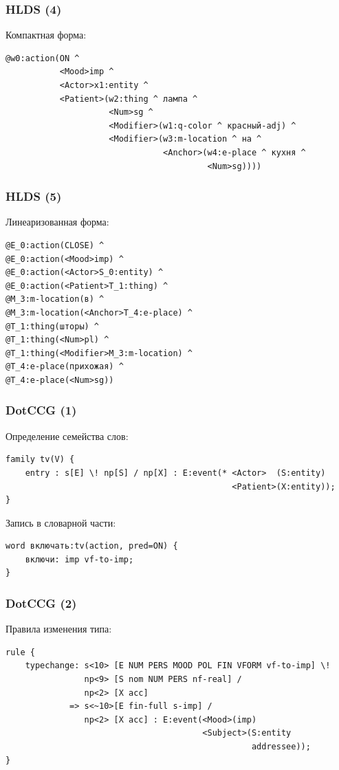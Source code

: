 \documentclass{beamer}
\begin{document}
\begin{frame}[fragile]
\frametitle{HLDS (4)}
Компактная форма:
{\footnotesize \begin{verbatim}
@w0:action(ON ^
           <Mood>imp ^
           <Actor>x1:entity ^
           <Patient>(w2:thing ^ лампа ^
                     <Num>sg ^
                     <Modifier>(w1:q-color ^ красный-adj) ^
                     <Modifier>(w3:m-location ^ на ^
                                <Anchor>(w4:e-place ^ кухня ^
                                         <Num>sg))))
\end{verbatim}}
\end{frame}

\begin{frame}[fragile]
\frametitle{HLDS (5)}
Линеаризованная форма:
{\footnotesize \begin{verbatim}
@E_0:action(CLOSE) ^ 
@E_0:action(<Mood>imp) ^
@E_0:action(<Actor>S_0:entity) ^ 
@E_0:action(<Patient>T_1:thing) ^ 
@M_3:m-location(в) ^ 
@M_3:m-location(<Anchor>T_4:e-place) ^ 
@T_1:thing(шторы) ^ 
@T_1:thing(<Num>pl) ^ 
@T_1:thing(<Modifier>M_3:m-location) ^ 
@T_4:e-place(прихожая) ^ 
@T_4:e-place(<Num>sg))
\end{verbatim}}
\end{frame}

\begin{frame}[fragile]
\frametitle{DotCCG (1)}
Определение семейства слов:
{\footnotesize \begin{verbatim}
family tv(V) {
    entry : s[E] \! np[S] / np[X] : E:event(* <Actor>  (S:entity) 
                                              <Patient>(X:entity));
}
\end{verbatim}}
\bigskip
\bigskip
Запись в словарной части:
{\footnotesize \begin{verbatim}
word включать:tv(action, pred=ON) {
    включи: imp vf-to-imp;
}
\end{verbatim}}
\end{frame}

\begin{frame}[fragile]
\frametitle{DotCCG (2)}
Правила изменения типа:
{\footnotesize \begin{verbatim}
rule {
    typechange: s<10> [E NUM PERS MOOD POL FIN VFORM vf-to-imp] \! 
                np<9> [S nom NUM PERS nf-real] / 
                np<2> [X acc]
             => s<~10>[E fin-full s-imp] / 
                np<2> [X acc] : E:event(<Mood>(imp) 
                                        <Subject>(S:entity 
                                                  addressee));
}
\end{verbatim}}
\end{frame}
\end{document}

